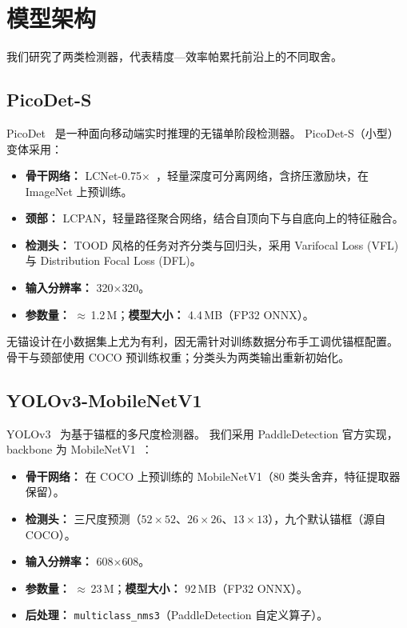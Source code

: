 \section{模型架构}
\label{sec:methodology}

我们研究了两类检测器，代表精度—效率帕累托前沿上的不同取舍。

\subsection{PicoDet-S}

PicoDet~\citep{yu2021picodet} 是一种面向移动端实时推理的无锚单阶段检测器。
PicoDet-S（小型）变体采用：

\begin{itemize}[leftmargin=1.5em]
  \item \textbf{骨干网络：} LCNet-0.75$\times$~\citep{cui2021pp}，轻量深度可分离网络，含挤压激励块，在 ImageNet 上预训练。
  \item \textbf{颈部：} LCPAN，轻量路径聚合网络，结合自顶向下与自底向上的特征融合。
  \item \textbf{检测头：} TOOD 风格的任务对齐分类与回归头，采用 Varifocal Loss (VFL) 与 Distribution Focal Loss (DFL)。
  \item \textbf{输入分辨率：} 320$\times$320。
  \item \textbf{参数量：} $\approx$\,1.2\,M；\textbf{模型大小：} 4.4\,MB（FP32 ONNX）。
\end{itemize}

无锚设计在小数据集上尤为有利，因无需针对训练数据分布手工调优锚框配置。
骨干与颈部使用 COCO 预训练权重；分类头为两类输出重新初始化。

\subsection{YOLOv3-MobileNetV1}

YOLOv3~\citep{redmon2018yolov3} 为基于锚框的多尺度检测器。
我们采用 PaddleDetection 官方实现， backbone 为 MobileNetV1~\citep{howard2017mobilenets}：

\begin{itemize}[leftmargin=1.5em]
  \item \textbf{骨干网络：} 在 COCO 上预训练的 MobileNetV1（80 类头舍弃，特征提取器保留）。
  \item \textbf{检测头：} 三尺度预测（$52\!\times\!52$、$26\!\times\!26$、$13\!\times\!13$），九个默认锚框（源自 COCO）。
  \item \textbf{输入分辨率：} 608$\times$608。
  \item \textbf{参数量：} $\approx$\,23\,M；\textbf{模型大小：} 92\,MB（FP32 ONNX）。
  \item \textbf{后处理：} \texttt{multiclass\_nms3}（PaddleDetection 自定义算子）。
\end{itemize}

